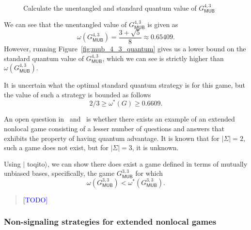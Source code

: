 \documentclass[nofootinbib,superscriptaddress,a4paper,twocolumn,longbibliography,floatfix,pra]{revtex4-2}
\newcommand{\comment}[1]{\begin{quote}\sf 
    \textcolor{blue}{[#1]}\end{quote}}
\renewcommand{\abs}[1]{\lvert #1 \rvert}
\newcommand{\toqitofont}{%
	\fontfamily{FiraSans}%
	\selectfont}
\newcommand{\toqito}{ $|${\toqitofont toqito}$\rangle$\xspace}
\def\MUB{\mathsf{MUB}}
\begin{document}
\begin{figure}[!htpb]
    \centering
            
    \caption{Calculate the unentangled and standard quantum value of
    $G_{\MUB}^{4, 3}$}
    \label{fig:mub_4_3_unentangled_quantum}
\end{figure}

We can see that the unentangled value of $G_{\MUB}^{4,3}$ is given as
\begin{equation} 
    \omega(G_{\MUB}^{4,3}) = 
    \frac{3 + \sqrt{5}}{8} \approx 0.65409.  
\end{equation} 
However, running Figure~\ref{fig:mub_4_3_quantum} gives us a lower bound on the
standard quantum value of $G_{\MUB}^{4,3}$, which we can see is strictly higher
than $\omega(G_{\MUB}^{4,3})$. 

It is uncertain what the optimal standard quantum strategy is for this game,
but the value of such a strategy is bounded as
follows~\cite{johnston2016extended}
\begin{equation}
    2/3 \geq \omega^*(G) \geq 0.6609.
\end{equation}

An open question in~\cite{russo2017thesis} and~\cite{johnston2016extended} is
whether there exists an example of an extended nonlocal game consisting of a
lesser number of questions and answers that exhibits the property of having
quantum advantage. It is known that for $\abs{\Sigma} = 2$, such a game does
not exist, but for $\abs{\Sigma} = 3$, it is unknown.

Using \toqito, we can show there does exist a game defined in terms of mutually
unbiased bases, specifically, the game $G_{\MUB}^{3,3}$ for which
\begin{equation}
    \omega(G_{\MUB}^{3,3}) < \omega^*(G_{\MUB}^{3,3}).
\end{equation}

\comment{TODO}

\subsubsection{Non-signaling strategies for extended nonlocal games}
\label{sec:non_signaling_value_bb84_extended_nonlocal_game}
\end{document}
